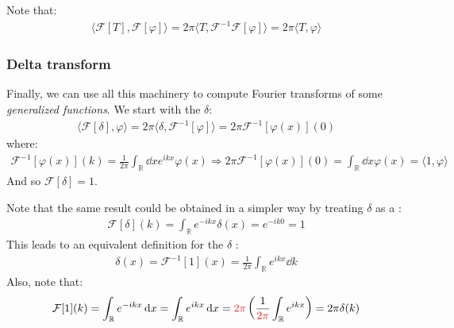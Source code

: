 \documentclass[../template.tex]{subfiles}
\begin{document}
Note that:
\begin{align}\label{eqn:unitary}
    \langle \mathcal{F}[T], \mathcal{F}[\varphi] \rangle = 2\pi \langle T, \mathcal{F}^{-1} \mathcal{F}[\varphi] \rangle = 2 \pi \langle T, \varphi \rangle
\end{align}

\subsubsection{Delta transform}
Finally, we can use all this machinery to compute Fourier transforms of some \textit{generalized functions}. We start with the $\delta$:
\begin{align*}
    \langle \mathcal{F}[\delta], \varphi \rangle = 2 \pi\langle \delta, \mathcal{F}^{-1}[\varphi]\rangle = 2\pi\mathcal{F}^{-1}[\varphi(x)](0)
\end{align*}
where:
\begin{align*}
    \mathcal{F}^{-1}[\varphi(x)](k) = \frac{1}{2\pi} \int_{\mathbb{R}} \dd{x} e^{ikx} \varphi(x) \Rightarrow 2 \pi\mathcal{F}^{-1}[\varphi(x)](0) = \int_{\mathbb{R}} \dd{x} \varphi(x) = \langle 1, \varphi \rangle 
\end{align*}
And so $\mathcal{F}[\delta] = 1$. 

\medskip

Note that the same result could be obtained in a simpler way by treating $\delta$ as a :
\begin{align*}
    \mathcal{F}[\delta](k) = \int_{\mathbb{R}} e^{-ikx} \delta(x) = e^{-ik 0} =  1
\end{align*}
This leads to an equivalent definition for the $\delta$ :
\begin{align*}
    \delta(x) = \mathcal{F}^{-1}[1](x) = \frac{1}{2\pi} \int_{\mathbb{R}} e^{ikx} \dd{k}
\end{align*}
Also, note that:
\begin{align} \label{eqn:1-transform}
    \mathcal{F}[1](k) = \int_{\mathbb{R}} e^{-ikx} \dd{x} = \int_{\mathbb{R}} e^{ikx} \dd{x} = \textcolor{Red}{2 \pi} \left( \frac{1}{\textcolor{Red}{2 \pi}} \int_{\mathbb{R}} e^{ikx}  \right) = 2\pi \delta(k)
\end{align}
\end{document}
